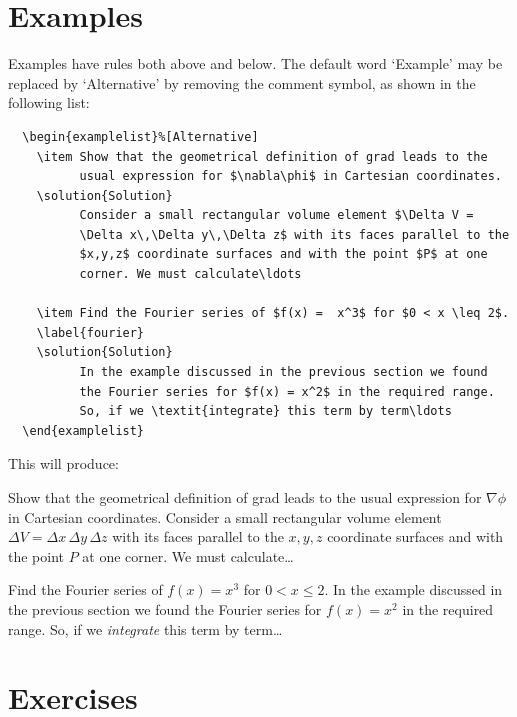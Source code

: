 \section{Examples}
\label{examples}
Examples have rules both above and below. The default word `Example' may be replaced by `Alternative' by removing the comment symbol, as shown in the following list:
\begin{verbatim}
  \begin{examplelist}%[Alternative]
    \item Show that the geometrical definition of grad leads to the
          usual expression for $\nabla\phi$ in Cartesian coordinates.
    \solution{Solution}
          Consider a small rectangular volume element $\Delta V =
          \Delta x\,\Delta y\,\Delta z$ with its faces parallel to the
          $x,y,z$ coordinate surfaces and with the point $P$ at one
          corner. We must calculate\ldots

    \item Find the Fourier series of $f(x) =  x^3$ for $0 < x \leq 2$.
    \label{fourier}
    \solution{Solution}
          In the example discussed in the previous section we found
          the Fourier series for $f(x) = x^2$ in the required range.
          So, if we \textit{integrate} this term by term\ldots
  \end{examplelist}
\end{verbatim}
This will produce:
  \begin{examplelist}%
    \item Show that the geometrical definition of grad leads to the
          usual expression for $\nabla\phi$ in Cartesian coordinates.
          Consider a small rectangular volume element $\Delta V =
          \Delta x\,\Delta y\,\Delta z$ with its faces parallel to the
          $x,y,z$ coordinate surfaces and with the point $P$ at one
          corner. We must calculate\ldots

    \item Find the Fourier series of $f(x) =  x^3$ for $0 < x \leq 2$.
    \label{fourier}
          In the example discussed in the previous section we found
          the Fourier series for $f(x) = x^2$ in the required range.
          So, if we \textit{integrate} this term by term\ldots
  \end{examplelist}

\section{Exercises}

